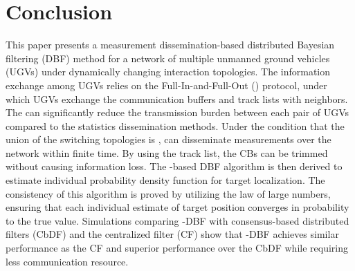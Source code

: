 \section{Conclusion}\label{sec:conclu}	
	This paper presents a measurement dissemination-based distributed Bayesian filtering (DBF) method for a network of multiple unmanned ground vehicles (UGVs) under dynamically changing interaction topologies.
	The information exchange among UGVs relies on the Full-In-and-Full-Out (\proto) protocol, under which UGVs exchange the communication buffers and track lists with neighbors.
	The {\proto} can significantly reduce the transmission burden between each pair of UGVs compared to the statistics dissemination methods. %
	Under the condition that the union of the switching topologies is \fc, {\proto} can disseminate measurements over the network within finite time. 
	By using the track list, the CBs can be trimmed without causing information loss.
	The \proto-based DBF algorithm is then derived to estimate individual probability density function for target localization. 	
	The consistency of this algorithm is proved by utilizing the law of large numbers, ensuring that each individual estimate of target position converges in probability to the true value.
	Simulations comparing \proto-DBF with consensus-based distributed filters (CbDF) and the centralized filter (CF) show that \proto-DBF achieves similar performance as the CF and superior performance over the CbDF while requiring less communication resource.
	
